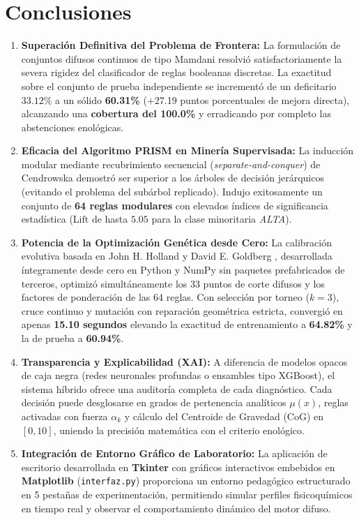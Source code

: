 \documentclass{article}
\begin{document}

\section{Conclusiones}

\begin{enumerate}
    \item \textbf{Superación Definitiva del Problema de Frontera:} La formulación de conjuntos difusos continuos de tipo Mamdani resolvió satisfactoriamente la severa rigidez del clasificador de reglas booleanas discretas. La exactitud sobre el conjunto de prueba independiente se incrementó de un deficitario $33.12\%$ a un sólido \textbf{60.31\%} (+27.19 puntos porcentuales de mejora directa), alcanzando una \textbf{cobertura del 100.0\%} y erradicando por completo las abstenciones enológicas.
    \item \textbf{Eficacia del Algoritmo PRISM en Minería Supervisada:} La inducción modular mediante recubrimiento secuencial (\textit{separate-and-conquer}) de Cendrowska \cite{cendrowska1987prism} demostró ser superior a los árboles de decisión jerárquicos (evitando el problema del subárbol replicado). Indujo exitosamente un conjunto de \textbf{64 reglas modulares} con elevados índices de significancia estadística ($\text{Lift}$ de hasta $\mathbf{5.05}$ para la clase minoritaria \textit{ALTA}).
    \item \textbf{Potencia de la Optimización Genética desde Cero:} La calibración evolutiva basada en John H. Holland \cite{holland1975adaptation} y David E. Goldberg \cite{goldberg1989genetic}, desarrollada íntegramente desde cero en Python y NumPy sin paquetes prefabricados de terceros, optimizó simultáneamente los 33 puntos de corte difusos y los factores de ponderación de las 64 reglas. Con selección por torneo ($k=3$), cruce continuo y mutación con reparación geométrica estricta, convergió en apenas \textbf{15.10 segundos} elevando la exactitud de entrenamiento a \textbf{64.82\%} y la de prueba a \textbf{60.94\%}.
    \item \textbf{Transparencia y Explicabilidad (XAI):} A diferencia de modelos opacos de caja negra (redes neuronales profundas o ensambles tipo XGBoost), el sistema híbrido ofrece una auditoría completa de cada diagnóstico. Cada decisión puede desglosarse en grados de pertenencia analíticos $\mu(x)$, reglas activadas con fuerza $\alpha_k$ y cálculo del Centroide de Gravedad (CoG) en $[0, 10]$, uniendo la precisión matemática con el criterio enológico.
    \item \textbf{Integración de Entorno Gráfico de Laboratorio:} La aplicación de escritorio desarrollada en \textbf{Tkinter} con gráficos interactivos embebidos en \textbf{Matplotlib} (\texttt{interfaz.py}) proporciona un entorno pedagógico estructurado en 5 pestañas de experimentación, permitiendo simular perfiles fisicoquímicos en tiempo real y observar el comportamiento dinámico del motor difuso.
\end{enumerate}
\end{document}
